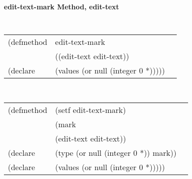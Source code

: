 %
%
%


{\samepage  
{\large {\bf edit-text-mark \hfill Method, edit-text}}
\begin{flushright} \parbox[t]{6.125in}{
\tt
\begin{tabular}{lll}
\raggedright
(defmethod & edit-text-mark & \\
& ((edit-text  edit-text)) \\
(declare & (values (or null (integer 0 *)))))
\end{tabular}
\rm

}\end{flushright}}

\begin{flushright} \parbox[t]{6.125in}{
\tt
\begin{tabular}{lll}
\raggedright
(defmethod & (setf edit-text-mark) & \\
         & (mark \\
         & (edit-text  edit-text)) \\
(declare &(type (or null (integer 0 *))  mark))\\
(declare & (values (or null (integer 0 *)))))
\end{tabular}
\rm}
\end{flushright}

